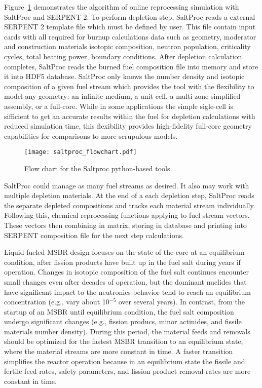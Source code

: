 Figure~\ref{fig:saltproc_flow} demonstrates the algorithm of online reprocessing simulation with SaltProc and SERPENT 2. To perform depletion step, SaltProc reads a external SERPENT 2 template file which must be defined by user. This file contain input cards with all required for burnup calculations data such as geometry, moderator and construction materials isotopic composition, neutron population, criticality cycles, total heating power, boundary conditions. After depletion calculation completes, SaltProc reads the burned fuel composition file into memory and store it into HDF5 database. SaltProc only knows the number density and isotopic composition of a given fuel stream which provides the tool with the flexibility to model any geometry: an infinite medium, a unit cell, a multi-zone simplified assembly, or a full-core. While in some applications the simple sigle-cell is sifficient to get an accurate results within the fuel for depletion calculations with reduced simulation time, this flexibility provides high-fidelity full-core geometry capabilities for comparisons to more scrupulous models.

\begin{figure}[htp!] %
  \centering
  \vspace{-0.3em}
  \texttt{[image: saltproc\_flowchart.pdf]}
  \caption{Flow chart for the Saltproc python-based tools.}
  \vspace{-0.6em}
  \label{fig:saltproc_flow}
\end{figure}
\FloatBarrier

SaltProc could manage as many fuel streams as desired. It also may work with multiple depletion materials. At the end of a each depletion step, SaltProc reads the separate depleted compositions and tracks each material stream individually. Following this, chemical reprocessing functions applying to fuel stream vectors. These vectors then combining in matrix, storing in database and printing into SERPENT composition file for the next step calculations.

Liquid-fueled \gls{MSBR} design focuses on the state of the core at an equilibrium condition, after fission products have built up in the fuel salt during years if operation. Changes in isotopic composition of the fuel salt continues encounter small changes even after decades of operation, but the dominant nuclides that have significant impact to the neutronics behavior tend to reach an equilibrium concentration (e.g., vary about 10$^{-5}$ over several years). In contrast, from the startup of an \gls{MSBR} until equilibrium condition, the fuel salt composition undergo significant changes (e.g., fission producs, minor actinides, and fissile materials number density). During this period, the material feeds and removals should be optimized for the fastest \gls{MSBR} transition to an equilibrium state, where the material streams are more constant in time. A faster transition simplifies the reactor operation because in an equilibrium state the fissile and fertile feed rates, safety parameters, and fission product removal rates are more constant in time.

